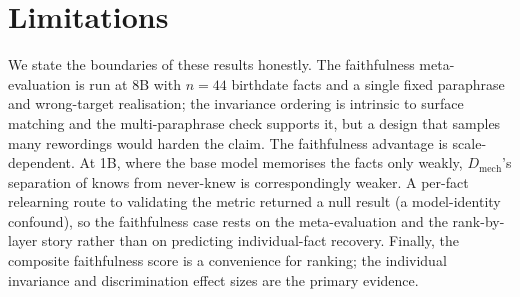 \section{Limitations}
\label{sec:r-limits}

We state the boundaries of these results honestly. The faithfulness meta-evaluation is run at 8B with
$n=44$ birthdate facts and a single fixed paraphrase and wrong-target realisation; the invariance ordering
is intrinsic to surface matching and the multi-paraphrase check supports it, but a design that samples many
rewordings would harden the claim. The faithfulness advantage is scale-dependent. At 1B, where the base
model memorises the facts only weakly, $D_\text{mech}$'s separation of knows from never-knew is
correspondingly weaker. A per-fact relearning route to validating the metric returned a null result (a
model-identity confound), so the faithfulness case rests on the meta-evaluation and the rank-by-layer story
rather than on predicting individual-fact recovery. Finally, the composite faithfulness score is a
convenience for ranking; the individual invariance and discrimination effect sizes are the primary
evidence.
